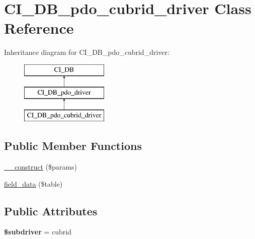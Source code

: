 \hypertarget{class_c_i___d_b__pdo__cubrid__driver}{}\section{C\+I\+\_\+\+D\+B\+\_\+pdo\+\_\+cubrid\+\_\+driver Class Reference}
\label{class_c_i___d_b__pdo__cubrid__driver}
Inheritance diagram for C\+I\+\_\+\+D\+B\+\_\+pdo\+\_\+cubrid\+\_\+driver\+:\begin{figure}[H]
\begin{center}
\leavevmode
\includegraphics[height=3.000000cm]{class_c_i___d_b__pdo__cubrid__driver}
\end{center}
\end{figure}
\subsection*{Public Member Functions}
\begin{DoxyCompactItemize}
\item 
\mbox{\hyperlink{class_c_i___d_b__pdo__cubrid__driver_a5cfa45da3a912dfd8117f3c2b942e591}{\+\_\+\+\_\+construct}} (\$params)
\item 
\mbox{\hyperlink{class_c_i___d_b__pdo__cubrid__driver_a415a8f62cbf7097b55520458f10cc17e}{field\+\_\+data}} (\$table)
\end{DoxyCompactItemize}
\subsection*{Public Attributes}
\begin{DoxyCompactItemize}
\item 
\mbox{\label{class_c_i___d_b__pdo__cubrid__driver_a4bbc29da8e1fffa5114e223d8253a64c}} 
{\bfseries \$subdriver} = \textquotesingle{}cubrid\textquotesingle{}
\end{DoxyCompactItemize}
